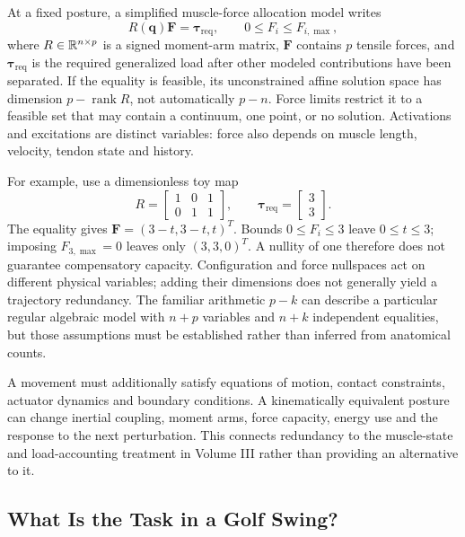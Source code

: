 At a fixed posture, a simplified muscle-force allocation model writes
\begin{equation}
 R(\bm q)\bm F=\bm\tau_{\mathrm{req}},\qquad
 0\leq F_i\leq F_{i,\max},
 \label{eq:ch1:force-allocation}
\end{equation}
where $R\in\mathbb{R}^{n\times p}$ is a signed moment-arm matrix, $\bm F$ contains
$p$ tensile forces, and $\bm\tau_{\mathrm{req}}$ is the required generalized
load after other modeled contributions have been separated.
If the equality is feasible, its unconstrained affine solution space has
dimension $p-\operatorname{rank}R$, not automatically $p-n$.
Force limits restrict it to a feasible set that may contain a continuum, one
point, or no solution. Activations and excitations are distinct variables:
force also depends on muscle length, velocity, tendon state and history.

For example, use a dimensionless toy map
\[
 R=\begin{bmatrix}1&0&1\\0&1&1\end{bmatrix},\qquad
 \bm\tau_{\mathrm{req}}=\begin{bmatrix}3\\3\end{bmatrix}.
\]
The equality gives $\bm F=(3-t,3-t,t)^T$.
Bounds $0\leq F_i\leq3$ leave $0\leq t\leq3$; imposing $F_{3,\max}=0$
leaves only $(3,3,0)^T$.
A nullity of one therefore does not guarantee compensatory capacity.
Configuration and force nullspaces act on different physical variables;
adding their dimensions does not generally yield a trajectory redundancy.
The familiar arithmetic $p-k$ can describe a particular regular algebraic
model with $n+p$ variables and $n+k$ independent equalities, but those
assumptions must be established rather than inferred from anatomical counts.

A movement must additionally satisfy equations of motion, contact constraints,
actuator dynamics and boundary conditions.
A kinematically equivalent posture can change inertial coupling, moment arms,
force capacity, energy use and the response to the next perturbation.
This connects redundancy to the muscle-state and load-accounting treatment
in Volume III rather than providing an alternative to it.

\subsection{What Is the Task in a Golf Swing?}

